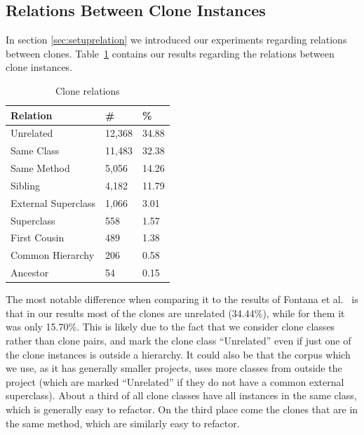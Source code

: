 \subsection{Relations Between Clone Instances} \label{chap:relationsinstances}
In section \ref{sec:setuprelation} we introduced our experiments regarding relations between clones. Table~\ref{table:relations} contains our results regarding the relations between clone instances.

\begin{table}[H]
  \begin{center}
  \caption{Clone relations} \label{table:relations}
  \medskip
\begin{tabular}{|l|l|l|} \hline
\textbf{Relation} & \textbf{\#} & \textbf{\%} \\ \hline
Unrelated          & 12,368 & 34.88            \\ \hline
Same Class          & 11,483 & 32.38             \\ \hline
Same Method               & 5,056 & 14.26            \\ \hline
Sibling         & 4,182 & 11.79             \\ \hline
External Superclass   & 1,066 & 3.01             \\ \hline
Superclass          & 558 & 1.57           \\ \hline
First Cousin          & 489 & 1.38           \\ \hline
Common Hierarchy    & 206 & 0.58            \\ \hline
Ancestor          & 54 & 0.15          \\ \hline
\end{tabular}
\end{center}
\end{table}

The most notable difference when comparing it to the results of Fontana et al.~\cite{fontana2015duplicated} is that in our results most of the clones are unrelated (34.44\%), while for them it was only 15.70\%. This is likely due to the fact that we consider clone classes rather than clone pairs, and mark the clone class ``Unrelated'' even if just one of the clone instances is outside a hierarchy. It could also be that the corpus which we use, as it has generally smaller projects, uses more classes from outside the project (which are marked ``Unrelated'' if they do not have a common external superclass). About a third of all clone classes have all instances in the same class, which is generally easy to refactor. On the third place come the clones that are in the same method, which are similarly easy to refactor.

